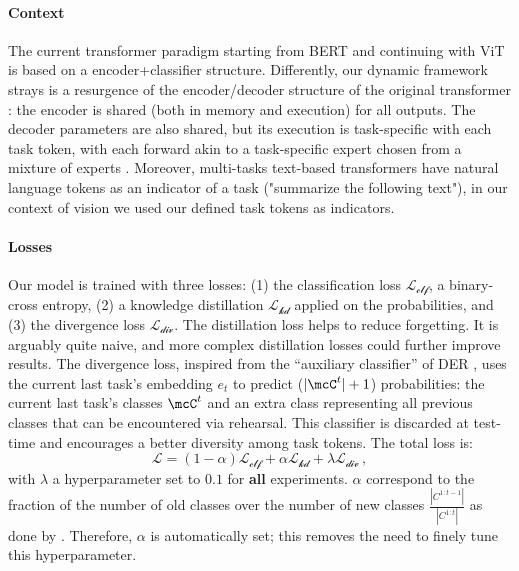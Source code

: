 \paragraph{Context} The current transformer paradigm starting from BERT \citep{devlin2018bert} and
continuing with ViT \citep{dosovitskiy2020vit} is based on a encoder+classifier structure.
Differently, our dynamic framework strays is a resurgence of the encoder/decoder structure of the
original transformer \citep{vaswani2017transformer}: the encoder is shared (both in memory and
execution) for all outputs. The decoder parameters are also shared, but its execution is
task-specific with each task token, with each forward akin to a task-specific expert chosen from a
mixture of experts \citep{masoudnia2014mixture}. Moreover, multi-tasks text-based transformers have
natural language tokens as an indicator of a task \citep{raffel2019t5} (\eg "summarize the
following text"), in our context of vision we used our defined task tokens as indicators.

\label{sec:dytox_training}

\paragraph{Losses} Our model is trained with three losses: (1) the classification loss
$\mathcal{L_\text{clf}}$, a binary-cross entropy, (2) a knowledge distillation
\citep{hinton2015knowledge_distillation} $\mathcal{L_\text{kd}}$ applied on the probabilities, and
(3) the divergence loss $\mathcal{L_\text{div}}$. The distillation loss helps to reduce forgetting.
It is arguably quite naive, and more complex distillation losses
\citep{selvaraju2017gradcam,hou2019ucir} could further improve results. The
divergence loss, inspired from the ``auxiliary classifier'' of DER \citep{yan2021der}, uses the
current last task's embedding $e_t$ to predict ($|\mcC^t| + 1$) probabilities: the current last
task's classes $\mcC^t$ and an extra class representing all previous classes that can be encountered
via rehearsal. This classifier is discarded at test-time and encourages a better diversity among
task tokens. The total loss is:
%
\begin{equation}
    \mathcal{L} = (1 - \alpha) \mathcal{L_\text{clf}} + \alpha \mathcal{L_\text{kd}} + \lambda \mathcal{L_\text{div}}\,,
    \label{eq:dytox_final_loss}
\end{equation}
%
with $\lambda$ a hyperparameter set to $0.1$ for \textbf{all} experiments. $\alpha$ correspond to
the fraction of the number of old classes over the number of new classes
$\frac{|C^{1:t-1}|}{|C^{1:t}|}$ as done by \citet{zhao2020weightalignement}. Therefore, $\alpha$ is
automatically set; this removes the need to finely tune this hyperparameter.


